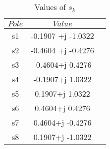 \begin{table}[H]
    \centering
\begin{tabular}{|c|c|c|}
\hline
 \textbf{$Pole$} & \textbf{$Value$}   \\ \hline
s1              & -0.1907 +j -1.0322 \\ \hline
s2              & -0.4604 +j -0.4276 \\ \hline
s3              & -0.4604+j 0.4276   \\ \hline
s4              & -0.1907+j 1.0322   \\ \hline
s5              & 0.1907+j 1.0322    \\ \hline
s6              & 0.4604+j 0.4276    \\ \hline
s7              & 0.4604+j -0.4276   \\ \hline
s8              & 0.1907+j -1.0322   \\ \hline
\end{tabular}
\caption{Values of $s_k$}
\label{tab:values poles sk}
\end{table}
